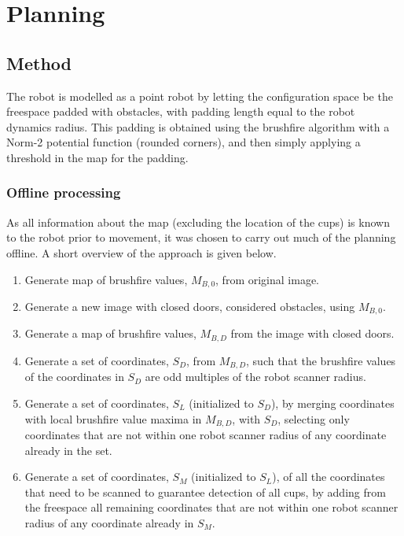 \section{Planning}
\label{sec:planning}
\subsection{Method}

The robot is modelled as a point robot by letting the configuration space be the freespace padded with obstacles,
with padding length equal to the robot dynamics radius.
This padding is obtained using the brushfire algorithm with a Norm-2 potential function (rounded corners),
and then simply applying a threshold in the map for the padding.


\subsubsection{Offline processing}

As all information about the map (excluding the location of the cups) is known to the robot prior to movement,
it was chosen to carry out much of the planning offline.
A short overview of the approach is given below. 

\begin{enumerate}
\item Generate map of brushfire values, \(M_{B,0}\), from original image.
\item Generate a new image with closed doors, considered obstacles, using \(M_{B,0}\).
\item Generate a map of brushfire values, \(M_{B,D}\) from the image with closed doors.
\item Generate a set of coordinates, \(S_{D}\), from \(M_{B,D}\),
such that the brushfire values of the coordinates in \(S_{D}\) are odd multiples of the robot scanner radius.
\item Generate a set of coordinates, \(S_{L}\) (initialized to \(S_{D}\)), by merging coordinates with local brushfire value maxima
in \(M_{B,D}\), with \(S_{D}\), selecting only coordinates that are not within one robot scanner radius
of any coordinate already in the set.
\item Generate a set of coordinates, \(S_{M}\) (initialized to \(S_{L}\)), of all the coordinates that need to be scanned
to guarantee detection of all cups, by adding from the freespace all remaining coordinates
that are not within one robot scanner radius of any coordinate already in \(S_{M}\).
\end{enumerate}



